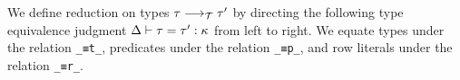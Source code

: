 \documentclass[authoryear, acmsmall, screen, review, nonacm]{acmart}
\begin{document}
We define reduction on types $\tau \longrightarrow_{\mathcal T} \tau'$ by directing the following type equivalence judgment $\Delta \vdash \tau = \tau' : \kappa$ from left to right. We equate types under the relation \verb!_≡t_!, predicates under the relation \verb!_≡p_!, and row literals under the relation \verb!_≡r_!.

\begin{code}[hide]%
\>[0]\AgdaSpace{}%
\AgdaSpace{}%
\<%
\\
\>[0]\AgdaSpace{}%
\AgdaSpace{}%
\<%
\end{code}
\begin{code}%
\>[0]\AgdaSpace{}%
\AgdaSpace{}%
\AgdaSymbol{:}\AgdaSpace{}%
\AgdaSpace{}%
\AgdaSpace{}%
\AgdaSpace{}%
\AgdaOperator{\AgdaInductiveConstructor{R[}}\AgdaSpace{}%
\AgdaSpace{}%
\AgdaOperator{\AgdaInductiveConstructor{]}}\AgdaSpace{}%
\AgdaSpace{}%
\AgdaSpace{}%
\AgdaSpace{}%
\AgdaSpace{}%
\AgdaOperator{\AgdaInductiveConstructor{R[}}\AgdaSpace{}%
\AgdaSpace{}%
\AgdaOperator{\AgdaInductiveConstructor{]}}\AgdaSpace{}%
\AgdaSpace{}%
\<%
\\
\>[0]\AgdaSpace{}%
\AgdaSpace{}%
\AgdaSymbol{:}\AgdaSpace{}%
\AgdaSpace{}%
\AgdaSpace{}%
\AgdaSpace{}%
\AgdaSpace{}%
\AgdaSpace{}%
\AgdaSpace{}%
\AgdaSpace{}%
\AgdaSpace{}%
\<%
\\
\>[0]\AgdaSpace{}%
\AgdaSpace{}%
\AgdaSymbol{:}\AgdaSpace{}%
\AgdaSpace{}%
\AgdaSpace{}%
\AgdaSpace{}%
\AgdaOperator{\AgdaInductiveConstructor{R[}}\AgdaSpace{}%
\AgdaSpace{}%
\AgdaOperator{\AgdaInductiveConstructor{]}}\AgdaSpace{}%
\AgdaSpace{}%
\AgdaSpace{}%
\AgdaSpace{}%
\AgdaSpace{}%
\AgdaOperator{\AgdaInductiveConstructor{R[}}\AgdaSpace{}%
\AgdaSpace{}%
\AgdaOperator{\AgdaInductiveConstructor{]}}\AgdaSpace{}%
\AgdaSpace{}%
\<%
\end{code} 
\end{document}
